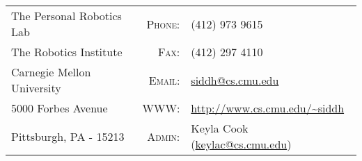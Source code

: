 \begin{center}
\begin{tabular}{lrl}
The Personal Robotics Lab & \textsc{Phone:} & (412) 973 9615 \\
The Robotics Institute& \textsc{Fax:} & (412) 297 4110 \\
Carnegie Mellon University& \textsc{Email:} & \url{siddh@cs.cmu.edu}\\
5000 Forbes Avenue&  \textsc{WWW:} & \url{http://www.cs.cmu.edu/~siddh}\\
Pittsburgh, PA - 15213 & \textsc{Admin:} & Keyla Cook (\url{keylac@cs.cmu.edu})
\end{tabular}
\end{center}

